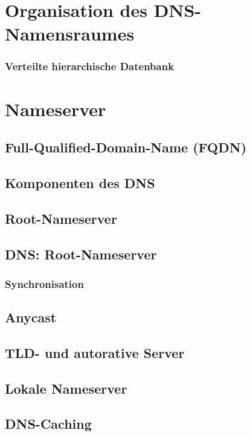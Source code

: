 \section{Organisation des DNS-Namensraumes}
\subsubsection*{Verteilte hierarchische Datenbank}

\section{Nameserver}
\subsection{Full-Qualified-Domain-Name (FQDN)}
\subsection{Komponenten des DNS}
\subsection{Root-Nameserver}
\subsection{DNS: Root-Nameserver}
\subsubsection*{Synchronisation}
\subsection{Anycast}
\subsection{TLD- und autorative Server}
\subsection{Lokale Nameserver}
\subsection{DNS-Caching}
